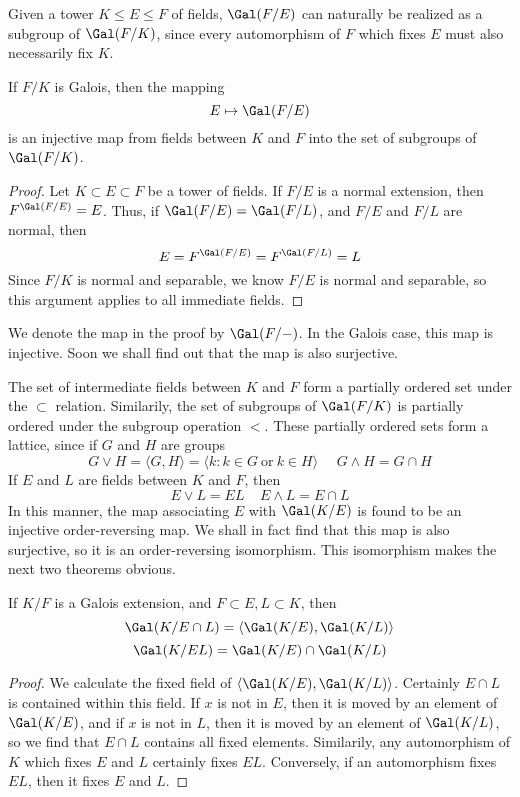 Given a tower $K \leq E \leq F$ of fields, $\Gal(F/E)$ can naturally be realized as a subgroup of $\Gal(F/K)$, since every automorphism of $F$ which fixes $E$ must also necessarily fix $K$.

\begin{lemma}
    If $F/K$ is Galois, then the mapping
    \[ E \mapsto \Gal(F/E) \]
    is an injective map from fields between $K$ and $F$ into the set of subgroups of $\Gal(F/K)$.
\end{lemma}
\begin{proof}
    Let $K \subset E \subset F$ be a tower of fields. If $F/E$ is a normal extension, then $F^{\Gal(F/E)} = E$. Thus, if $\Gal(F/E) = \Gal(F/L)$, and $F/E$ and $F/L$ are normal, then
    \[ E = F^{\Gal(F/E)} = F^{\Gal(F/L)} = L \]
    Since $F/K$ is normal and separable, we know $F/E$ is normal and separable, so this argument applies to all immediate fields.
\end{proof}

We denote the map in the proof by $\Gal(F/-)$. In the Galois case, this map is injective. Soon we shall find out that the map is also surjective.

The set of intermediate fields between $K$ and $F$ form a partially ordered set under the $\subset$ relation. Similarily, the set of subgroups of $\Gal(F/K)$ is partially ordered under the subgroup operation $<$. These partially ordered sets form a lattice, since if $G$ and $H$ are groups
%
\[ G \vee H = \langle G, H \rangle = \langle k : k \in G\ \text{or}\ k \in H \rangle\ \ \ \ \ \ G \wedge H = G \cap H \]
%
If $E$ and $L$ are fields between $K$ and $F$, then
%
\[ E \vee L = EL\ \ \ \ \ E \wedge L = E \cap L \]
%
In this manner, the map associating $E$ with $\Gal(K/E)$ is found to be an injective order-reversing map. We shall in fact find that this map is also surjective, so it is an order-reversing isomorphism. This isomorphism makes the next two theorems obvious.

\begin{prop}
    If $K/F$ is a Galois extension, and $F \subset E,L \subset K$, then
    \[ \Gal(K/E \cap L) = \langle \Gal(K/E), \Gal(K/L) \rangle \]
    \[ \Gal(K/EL) = \Gal(K/E) \cap \Gal(K/L) \]
\end{prop}
\begin{proof}
    We calculate the fixed field of $\langle \Gal(K/E), \Gal(K/L) \rangle$. Certainly $E \cap L$ is contained within this field. If $x$ is not in $E$, then it is moved by an element of $\Gal(K/E)$, and if $x$ is not in $L$, then it is moved by an element of $\Gal(K/L)$, so we find that $E \cap L$ contains all fixed elements. Similarily, any automorphism of $K$ which fixes $E$ and $L$ certainly fixes $EL$. Conversely, if an automorphism fixes $EL$, then it fixes $E$ and $L$.
\end{proof}

